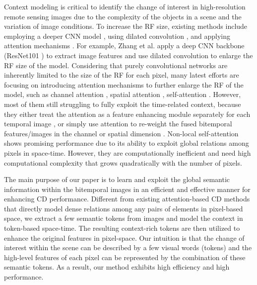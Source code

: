 \documentclass[journal]{IEEEtran}
\begin{document}
Context modeling is critical to identify the change of interest in high-resolution remote sensing images due to the complexity of the objects in a scene and the variation of image conditions. To increase the RF size, existing methods include employing a deeper CNN model \cite{Chen2020, Chen2020e, Zhang2019c, Zhang2020a}, using dilated convolution \cite{Zhang2019c}, and applying attention mechanisms \cite{Liu2019b, Zhang2020b, Peng2020a, Jiang2020, Chen2020e, Chen2020, Diakogiannis2020}. For example, Zhang et al. \cite{Zhang2019c} apply a deep CNN backbone (ResNet101 \cite{He2016}) to extract image features and use dilated convolution to enlarge the RF size of the model. Considering that purely convolutional networks are inherently limited to the size of the RF for each pixel, many latest efforts are focusing on introducing attention mechanisms to further enlarge the RF of the model, such as channel attention \cite{Liu2019b, Zhang2020b, Peng2020a, Jiang2020}, spatial attention \cite{Liu2019b, Zhang2020b, Peng2020a}, self-attention \cite{Chen2020e, Chen2020, Diakogiannis2020}. However, most of them still struggling to fully exploit the time-related context, because they either treat the attention as a feature enhancing module separately for each temporal image \cite{Liu2019b}, or simply use attention to re-weight the fused bitemporal features/images in the channel or spatial dimension \cite{Zhang2020b, Peng2020a, Jiang2020}. Non-local self-attention \cite{Chen2020e, Chen2020} shows promising performance due to its ability to exploit global relations among pixels in space-time. However, they are computationally inefficient and need high computational complexity that grows quadratically with the number of pixels. 

The main purpose of our paper is to learn and exploit the global semantic information within the bitemporal images in an efficient and effective manner for enhancing CD performance. Different from existing attention-based CD methods that directly model dense relations among any pairs of elements in pixel-based space, we extract a few semantic tokens from images and model the context in token-based space-time. The resulting context-rich tokens are then utilized to enhance the original features in pixel-space. Our intuition is that the change of interest within the scene can be described by a few visual words (tokens) and the high-level features of each pixel can be represented by the combination of these semantic tokens. As a result, our method exhibits high efficiency and high performance.
\end{document}
